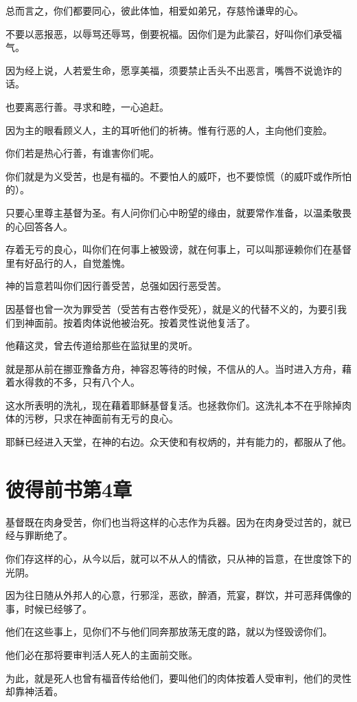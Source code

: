 \documentclass[12pt,oneside]{book}
\begin{document}
总而言之，你们都要同心，彼此体恤，相爱如弟兄，存慈怜谦卑的心。

不要以恶报恶，以辱骂还辱骂，倒要祝福。因你们是为此蒙召，好叫你们承受福气。

因为经上说，人若爱生命，愿享美福，须要禁止舌头不出恶言，嘴唇不说诡诈的话。

也要离恶行善。寻求和睦，一心追赶。

因为主的眼看顾义人，主的耳听他们的祈祷。惟有行恶的人，主向他们变脸。

你们若是热心行善，有谁害你们呢。

你们就是为义受苦，也是有福的。不要怕人的威吓，也不要惊慌（的威吓或作所怕的）。

只要心里尊主基督为圣。有人问你们心中盼望的缘由，就要常作准备，以温柔敬畏的心回答各人。

存着无亏的良心，叫你们在何事上被毁谤，就在何事上，可以叫那诬赖你们在基督里有好品行的人，自觉羞愧。

神的旨意若叫你们因行善受苦，总强如因行恶受苦。

因基督也曾一次为罪受苦（受苦有古卷作受死），就是义的代替不义的，为要引我们到神面前。按着肉体说他被治死。按着灵性说他复活了。

他藉这灵，曾去传道给那些在监狱里的灵听。

就是那从前在挪亚豫备方舟，神容忍等待的时候，不信从的人。当时进入方舟，藉着水得救的不多，只有八个人。

这水所表明的洗礼，现在藉着耶稣基督复活。也拯救你们。这洗礼本不在乎除掉肉体的污秽，只求在神面前有无亏的良心。

耶稣已经进入天堂，在神的右边。众天使和有权炳的，并有能力的，都服从了他。

\chapter{彼得前书第4章}
基督既在肉身受苦，你们也当将这样的心志作为兵器。因为在肉身受过苦的，就已经与罪断绝了。

你们存这样的心，从今以后，就可以不从人的情欲，只从神的旨意，在世度馀下的光阴。

因为往日随从外邦人的心意，行邪淫，恶欲，醉酒，荒宴，群饮，并可恶拜偶像的事，时候已经够了。

他们在这些事上，见你们不与他们同奔那放荡无度的路，就以为怪毁谤你们。

他们必在那将要审判活人死人的主面前交账。

为此，就是死人也曾有福音传给他们，要叫他们的肉体按着人受审判，他们的灵性却靠神活着。
\end{document}
